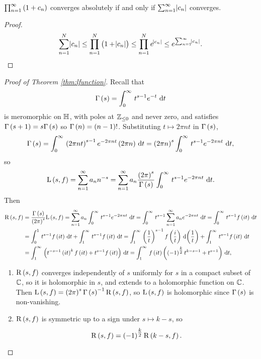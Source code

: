 \begin{lemma}
$ \prod_{n = 1}^\infty \br{1 + c_n} $ converges absolutely if and only if $ \sum_{n = 1}^\infty \abs{c_n} $ converges.
\end{lemma}

\begin{proof}
$$ \sum_{n = 1}^N \abs{c_n} \le \prod_{n = 1}^N \br{1 + \abs{c_n}} \le \prod_{n = 1}^N e^{\abs{c_n}} \le e^{\sum_{n = 1}^\infty \abs{c_n}}. $$
\end{proof}

\begin{proof}[Proof of Theorem \ref{thm:lfunction}]
Recall that
$$ \Gamma\br{s} = \intd{0}{\infty}{t^{s - 1}e^{-t}}{t} $$
is meromorphic on $ \mathbb{H} $, with poles at $ \mathbb{Z}_{\le 0} $ and never zero, and satisfies $ \Gamma\br{s + 1} = s\Gamma\br{s} $ so $ \Gamma\br{n} = \br{n - 1}! $. Substituting $ t \mapsto 2\pi nt $ in $ \Gamma\br{s} $,
$$ \Gamma\br{s} = \intd{0}{\infty}{\br{2\pi nt}^{s - 1}e^{-2\pi nt}\br{2\pi n}}{t} = \br{2\pi n}^s\intd{0}{\infty}{t^{s - 1}e^{-2\pi nt}}{t}, $$
so
$$ \L\br{s, f} = \sum_{n = 1}^\infty a_nn^{-s} = \sum_{n = 1}^\infty a_n\dfrac{\br{2\pi}^s}{\Gamma\br{s}}\intd{0}{\infty}{t^{s - 1}e^{-2\pi nt}}{t}. $$
Then
\begin{align*}
\R\br{s, f}
& = \dfrac{\Gamma\br{s}}{\br{2\pi}^s}\L\br{s, f}
= \sum_{n = 1}^\infty a_n\intd{0}{\infty}{t^{s - 1}e^{-2\pi nt}}{t}
= \intd{0}{\infty}{t^{s - 1}\sum_{n = 1}^\infty a_ne^{-2\pi nt}}{t}
= \intd{0}{\infty}{t^{s - 1}f\br{it}}{t} \\
& = \intd{0}{1}{t^{s - 1}f\br{it}}{t} + \intd{1}{\infty}{t^{s - 1}f\br{it}}{t}
= \intd{1}{\infty}{\br{\dfrac{1}{t}}^{s - 1}f\br{\dfrac{i}{t}}}{\br{\dfrac{1}{t}}} + \intd{1}{\infty}{t^{s - 1}f\br{it}}{t} \\
& = \intd{1}{\infty}{\br{t^{-s - 1}\br{it}^kf\br{it} + t^{s - 1}f\br{it}}}{t}
= \intd{1}{\infty}{f\br{it}\br{\br{-1}^{\tfrac{k}{2}}t^{k - s - 1} + t^{s - 1}}}{t},
\end{align*}
\begin{enumerate}
\item $ \R\br{s, f} $ converges independently of $ s $ uniformly for $ s $ in a compact subset of $ \mathbb{C} $, so it is holomorphic in $ s $, and extends to a holomorphic function on $ \mathbb{C} $. Then $ \L\br{s, f} = \br{2\pi}^s\Gamma\br{s}^{-1}\R\br{s, f} $, so $ \L\br{s, f} $ is holomorphic since $ \Gamma\br{s} $ is non-vanishing.
\item $ \R\br{s, f} $ is symmetric up to a sign under $ s \mapsto k - s $, so
$$ \R\br{s, f} = \br{-1}^{\tfrac{k}{2}}\R\br{k - s, f}. $$

\end{enumerate}
\end{proof}
